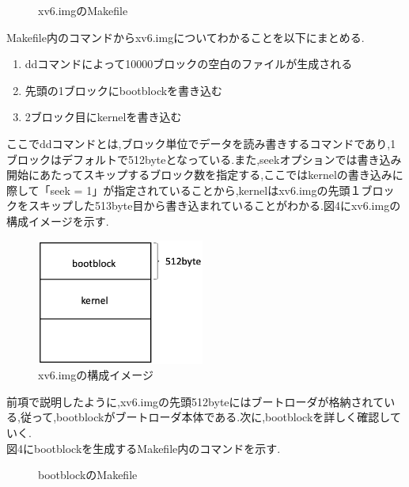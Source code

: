 \documentclass[submit,techreq,noauthor]{eco}	%
\begin{document}
\begin{figure}[H]
	\centering
	\caption{xv6.imgのMakefile}
\end{figure}

Makefile内のコマンドからxv6.imgについてわかることを以下にまとめる.

\begin{enumerate}
	\renewcommand{\labelenumi}{\arabic{enumi}).}
	\item ddコマンドによって10000ブロックの空白のファイルが生成される
	\item 先頭の1ブロックにbootblockを書き込む
	\item 2ブロック目にkernelを書き込む
\end{enumerate}

ここでddコマンドとは,ブロック単位でデータを読み書きするコマンドであり,1ブロックはデフォルトで512byteとなっている.また,seekオプションでは書き込み開始にあたってスキップするブロック数を指定する,ここではkernelの書き込みに際して「seek = 1」が指定されていることから,kernelはxv6.imgの先頭１ブロックをスキップした513byte目から書き込まれていることがわかる.図4にxv6.imgの構成イメージを示す.

\begin{figure}[H]
	\centering
	\includegraphics[width=5.5cm]{fig/pic3.eps}
	\caption{xv6.imgの構成イメージ}
	\label{sample}
\end{figure}

前項で説明したように,xv6.imgの先頭512byteにはブートローダが格納されている,従って,bootblockがブートローダ本体である.次に,bootblockを詳しく確認していく.\\
\indent 図4にbootblockを生成するMakefile内のコマンドを示す.

\begin{figure}[H]
	\centering
	\caption{bootblockのMakefile}
	\label{sample}
\end{figure}
\end{document}
